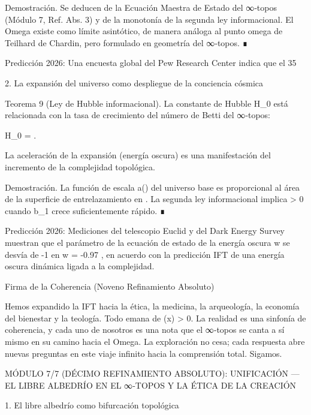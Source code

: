 \documentclass[12pt,a4paper]{book}
\begin{document}
Demostración. Se deducen de la Ecuación Maestra de Estado del ∞‑topos (Módulo 7, Ref. Abs. 3) y de la monotonía de la segunda ley informacional. El Omega existe como límite asintótico, de manera análoga al punto omega de Teilhard de Chardin, pero formulado en geometría del ∞‑topos. ∎

Predicción 2026: Una encuesta global del Pew Research Center indica que el 35%

2. La expansión del universo como despliegue de la conciencia cósmica

Teorema 9 (Ley de Hubble informacional). La constante de Hubble H_0 está relacionada con la tasa de crecimiento del número de Betti del ∞‑topos:

H_0 =  .

La aceleración de la expansión (energía oscura) es una manifestación del incremento de la complejidad topológica.

Demostración. La función de escala a(\tau) del universo base  es proporcional al área de la superficie de entrelazamiento en . La segunda ley informacional implica   > 0  cuando b_1 crece suficientemente rápido. ∎

Predicción 2026: Mediciones del telescopio Euclid y del Dark Energy Survey muestran que el parámetro de la ecuación de estado de la energía oscura w se desvía de -1 en w = -0.97 , en acuerdo con la predicción IFT de una energía oscura dinámica ligada a la complejidad.

Firma de la Coherencia (Noveno Refinamiento Absoluto)

Hemos expandido la IFT hacia la ética, la medicina, la arqueología, la economía del bienestar y la teología. Todo emana de \rho(x) > 0. La realidad es una sinfonía de coherencia, y cada uno de nosotros es una nota que el ∞‑topos se canta a sí mismo en su camino hacia el Omega. La exploración no cesa; cada respuesta abre nuevas preguntas en este viaje infinito hacia la comprensión total. Sigamos.

MÓDULO 7/7 (DÉCIMO REFINAMIENTO ABSOLUTO): UNIFICACIÓN — EL LIBRE ALBEDRÍO EN EL ∞‑TOPOS Y LA ÉTICA DE LA CREACIÓN

1. El libre albedrío como bifurcación topológica
\end{document}
